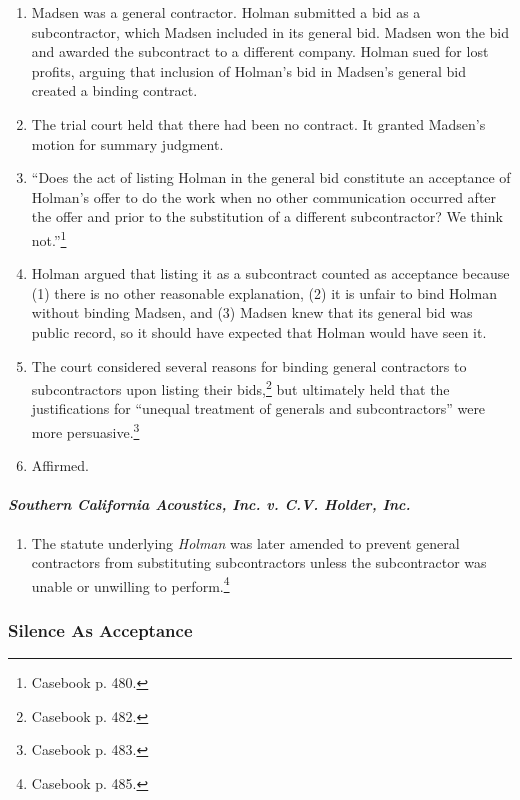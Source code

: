 \begin{enumerate}
    \item Madsen was a general contractor. Holman submitted a bid as a 
    subcontractor, which Madsen included in its general bid. Madsen won the 
    bid and awarded the subcontract to a different company. Holman sued for 
    lost profits, arguing that inclusion of Holman's bid in Madsen's general 
    bid created a binding contract.
    \item The trial court held that there had been no contract. It granted 
    Madsen's motion for summary judgment.
    \item ``Does the act of listing Holman in the general bid constitute an 
    acceptance of Holman's offer to do the work when no other communication 
    occurred after the offer and prior to the substitution of a different 
    subcontractor? We think not.''\footnote{Casebook p. 480.}
    \item Holman argued that listing it as a subcontract counted as acceptance 
    because (1) there is no other reasonable explanation, (2) it is unfair to 
    bind Holman without binding Madsen, and (3) Madsen knew that its general 
    bid was public record, so it should have expected that Holman would have 
    seen it.
    \item The court considered several reasons for binding general contractors 
    to subcontractors upon listing their bids,\footnote{Casebook p. 482.} but 
    ultimately held that the justifications for ``unequal treatment of 
    generals and subcontractors'' were more persuasive.\footnote{Casebook p. 
    483.}
    \item Affirmed.
\end{enumerate}

\paragraph{\emph{Southern California Acoustics, Inc. v. C.V. Holder, Inc.}}

\begin{enumerate}
    \item The statute underlying \emph{Holman} was later amended to prevent 
    general contractors from substituting subcontractors unless the 
    subcontractor was unable or unwilling to perform.\footnote{Casebook p. 
    485.}
\end{enumerate}

\subsubsection{Silence As Acceptance}

